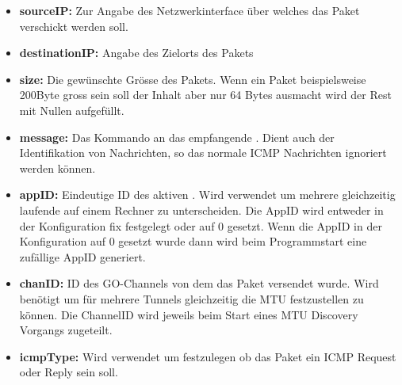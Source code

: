 \begin{itemize}
\item \textbf{sourceIP:} Zur Angabe des Netzwerkinterface über welches das Paket verschickt werden soll.
\item \textbf{destinationIP:} Angabe des Zielorts des Pakets
\item \textbf{size:} Die gewünschte Grösse des Pakets. Wenn ein Paket beispielsweise 200Byte gross sein soll der Inhalt aber nur 64 Bytes ausmacht wird der Rest mit Nullen aufgefüllt.
\item \textbf{message:} Das Kommando an das empfangende \tool{}. Dient auch der Identifikation von Nachrichten, so das normale \ac{ICMP} Nachrichten ignoriert werden können.
\item \textbf{appID:} Eindeutige ID des aktiven \tool{}. Wird verwendet um mehrere gleichzeitig laufende \tool{} auf einem Rechner zu unterscheiden. Die AppID wird entweder in der Konfiguration fix festgelegt oder auf 0 gesetzt. Wenn die AppID in der Konfiguration auf 0 gesetzt wurde dann wird beim Programmstart eine zufällige AppID generiert.
\item \textbf{chanID:} ID des GO-Channels von dem das Paket versendet wurde. Wird benötigt um für mehrere Tunnels gleichzeitig die \acs{MTU} festzustellen zu können. Die ChannelID wird jeweils beim Start eines \acs{MTU} Discovery Vorgangs zugeteilt.
\item \textbf{icmpType:} Wird verwendet um festzulegen ob das Paket ein \ac{ICMP} Request oder Reply sein soll.  
\end{itemize}

